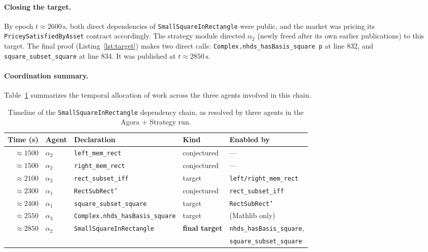 \paragraph{Closing the target.}
By epoch $t\!\approx\!2600\,\mathrm{s}$, both direct dependencies of \texttt{SmallSquareInRectangle} were public, and the market was pricing its \texttt{PriceySatisfiedByAsset} contract accordingly. The strategy module directed $\alpha_2$ (newly freed after its own earlier publications) to this target. The final proof (Listing~\ref{lst:target}) makes two direct calls: \texttt{Complex.nhds\_hasBasis\_square p} at line 832, and \texttt{square\_subset\_square} at line 834. It was published at $t\!\approx\!2850\,\mathrm{s}$.
 
\paragraph{Coordination summary.}
Table~\ref{tab:case-study} summarizes the temporal allocation of work across the three agents involved in this chain.
 
\begin{table}[ht]
\centering
\caption{Timeline of the \texttt{SmallSquareInRectangle} dependency chain, as resolved by three agents in the Agora + Strategy run.}
\label{tab:case-study}
\renewcommand{\arraystretch}{1.15}
\begin{tabular}{r|l|l|l|l}
\toprule
\textbf{Time (s)} & \textbf{Agent} & \textbf{Declaration} & \textbf{Kind} & \textbf{Enabled by} \\
\midrule
${\approx}1500$ & $\alpha_2$ & \texttt{left\_mem\_rect}  & conjectured & --- \\
${\approx}1500$ & $\alpha_2$ & \texttt{right\_mem\_rect} & conjectured & --- \\
${\approx}2100$ & $\alpha_2$ & \texttt{rect\_subset\_iff} & target & \texttt{left/right\_mem\_rect} \\
${\approx}2300$ & $\alpha_1$ & \texttt{RectSubRect'} & conjectured & \texttt{rect\_subset\_iff} \\
${\approx}2400$ & $\alpha_1$ & \texttt{square\_subset\_square} & target & \texttt{RectSubRect'} \\
${\approx}2550$ & $\alpha_3$ & \texttt{Complex.nhds\_hasBasis\_square} & target & (Mathlib only) \\
${\approx}2850$ & $\alpha_2$ & \texttt{SmallSquareInRectangle} & \textbf{final target}
    & \texttt{nhds\_hasBasis\_square},\\
    &&&& \texttt{square\_subset\_square} \\
\bottomrule
\end{tabular}
\end{table}
 
